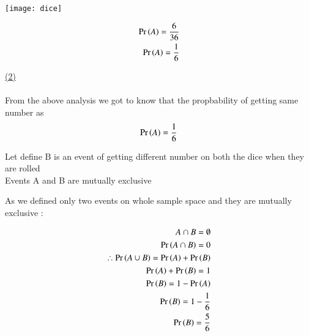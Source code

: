 \documentclass[journal,12pt,twocolumn]{IEEEtran}
\begin{document}
    \begin{center}
    \texttt{[image: dice]}
    \end{center}

    \begin{align*}
        \Pr\left(A\right)=\frac{6}{36}\\
        \Pr\left(A\right)=\frac{1}{6}
   \end{align*}


   \underline {(2)} \\ \\

   \noindent From the above analysis we got to know that the propbability of getting same number as 
   \begin{align*}
    \Pr\left(A\right)=\frac{1}{6}
\end{align*}

\noindent Let define {B} i\noindent s an event of getting different number on both the dice when they are rolled\\
Events {A} and {B} are mutually exclusive 

\noindent As we defined only two events on whole sample space and they are mutually exclusive  $ \colon $ 

\begin{align*}
 {A \cap B = \emptyset} \\
 \Pr\left(A \cap B\right)={0}\\
 \therefore \Pr\left(A \cup B\right)=\Pr\left(A\right)+\Pr\left(B\right)\\
 \Pr\left(A\right) + \Pr\left(B\right) = {1} \\
 \Pr\left(B\right) = {1}-\Pr\left(A\right) \\
 \Pr\left(B\right)={1}-\frac{1}{6}\\
 \Pr\left(B\right)=\frac{5}{6}
\end{align*}
\end{document}
